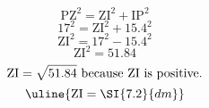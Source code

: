 \[\text{PZ}^{2}=\text{ZI}^{2}+\text{IP}^{2}\]
\[17^{2}=\text{ZI}^{2}+15.4^{2}\]
\[\text{ZI}^{2}=17^{2}-15.4^{2}\]
\[\text{ZI}^{2}=51.84\]
\[\text{ZI}=\sqrt{\mathstrut 51.84}\text{ because ZI is positive.}\]
\[\uline{\text{ZI}=\SI{7.2}{dm}}\]
